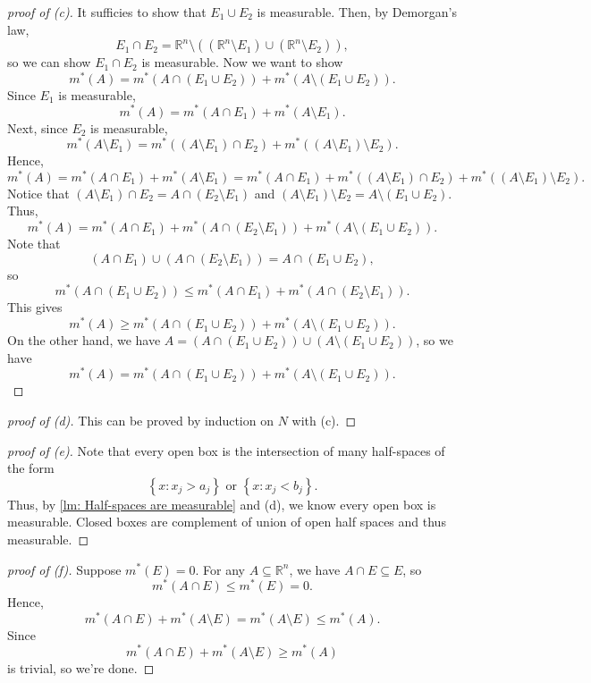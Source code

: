 \begin{proof}[proof of (c)]
    It sufficies to show that \(E_1 \cup E_2\) is measurable. Then, by Demorgan's law,
    \[
        E_1 \cap E_2 = \mathbb{R} ^n \setminus \left( (\mathbb{R} ^n \setminus E_1) \cup (\mathbb{R} ^n \setminus E_2) \right), 
    \] 
    so we can show \(E_1 \cap E_2\) is measurable. Now we want to show 
    \[
        m^*(A) = m^*(A \cap (E_1 \cup E_2)) + m^*(A \setminus (E_1 \cup E_2)).
    \]
    Since \(E_1\) is measurable,
    \[
        m^*(A) = m^*(A \cap E_1) + m^*(A \setminus E_1).
    \]  
    Next, since \(E_2\) is measurable,
    \[
        m^*(A \setminus E_1) = m^*((A \setminus E_1) \cap E_2) + m^*((A \setminus E_1) \setminus E_2).
    \]
    Hence,
    \[
        m^*(A) = m^*(A \cap E_1) + m^*(A \setminus E_1) = m^*(A \cap E_1) + m^*((A \setminus E_1) \cap E_2) + m^*((A \setminus E_1) \setminus E_2). 
    \]
    Notice that \((A \setminus E_1) \cap E_2 = A \cap (E_2 \setminus E_1)\) and \((A \setminus E_1) \setminus E_2 = A \setminus (E_1 \cup E_2)\). Thus,
    \[
        m^*(A) = m^*(A \cap E_1) + m^*(A \cap (E_2 \setminus E_1)) + m^*(A \setminus (E_1 \cup E_2)).
    \]
    Note that 
    \[
        (A \cap E_1) \cup (A \cap (E_2 \setminus E_1)) = A \cap (E_1 \cup E_2),
    \]   
    so 
    \[
        m^* (A \cap (E_1 \cup E_2)) \le m^*(A \cap E_1) + m^*(A \cap (E_2 \setminus E_1)).
    \]
    This gives
    \[
        m^*(A) \ge m^*(A \cap (E_1 \cup E_2)) + m^*(A \setminus (E_1 \cup E_2)).
    \]
    On the other hand, we have \(A = (A \cap (E_1 \cup E_2)) \cup (A \setminus (E_1 \cup E_2))\), so we have 
    \[
        m^*(A) = m^*(A \cap (E_1 \cup E_2)) + m^*(A \setminus (E_1 \cup E_2)).
    \] 
\end{proof}

\begin{proof}[proof of (d)]
    This can be proved by induction on \(N\) with (c).
\end{proof}

\begin{proof}[proof of (e)]
    Note that every open box is the intersection of many half-spaces of the form 
    \[
        \left\{ x: x_j > a_j \right\} \text{ or } \left\{ x: x_j < b_j \right\}.   
    \]
    Thus, by \autoref{lm: Half-spaces are measurable} and (d), we know every open box is measurable. Closed boxes are complement of union of open half spaces and thus measurable. 
\end{proof}

\begin{proof}[proof of (f)]
    Suppose \(m^*(E) = 0\). For any \(A \subseteq \mathbb{R} ^n\), we have \(A \cap E \subseteq E\), so 
    \[
        m^*(A \cap E) \le m^*(E) = 0.
    \]  
    Hence, 
    \[
        m^*(A \cap E) + m^*(A \setminus E) = m^*(A \setminus E) \le m^*(A).
    \]
    Since
    \[
        m^*(A \cap E) + m^*(A \setminus E) \ge m^*(A)
    \]
    is trivial, so we're done.
\end{proof}

